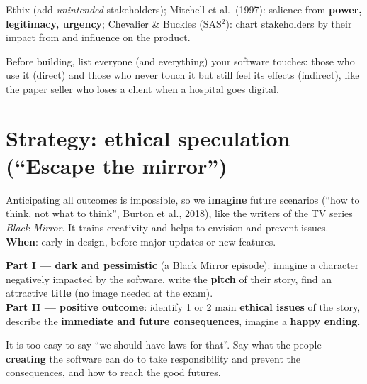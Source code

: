 \documentclass[11pt,a4paper,openany]{book}
\begin{document}
\begin{rembox}[title={Other approaches}]
Ethix (add \emph{unintended} stakeholders); Mitchell et al.\ (1997): salience from
\textbf{power, legitimacy, urgency}; Chevalier \& Buckles (SAS$^2$): chart stakeholders by their
impact from and influence on the product.
\end{rembox}

\begin{goatbox}
Before building, list everyone (and everything) your software touches: those who use it
(direct) and those who never touch it but still feel its effects (indirect), like the paper
seller who loses a client when a hospital goes digital.
\end{goatbox}


\section{Strategy: ethical speculation (``Escape the mirror'')}

\begin{defnbox}[title={Ethical speculation (Klassen \& Fiesler, 2022)}]
Anticipating all outcomes is impossible, so we \textbf{imagine} future scenarios
(``how to think, not what to think'', Burton et al., 2018), like the writers of the TV series
\emph{Black Mirror}. It trains creativity and helps to envision and prevent issues.
\textbf{When}: early in design, before major updates or new features.
\end{defnbox}

\begin{algbox}[title={Applying the strategy (cheat sheet 0.5)}]
\textbf{Part I --- dark and pessimistic} (a Black Mirror episode):
imagine a character negatively impacted by the software, write the \textbf{pitch} of their
story, find an attractive \textbf{title} (no image needed at the exam). \\
\textbf{Part II --- positive outcome}: identify 1 or 2 main \textbf{ethical issues} of the story,
describe the \textbf{immediate and future consequences}, imagine a \textbf{happy ending}.
\end{algbox}

\begin{warnbox}[title={Happy ending: not ``there should be a law''}]
It is too easy to say ``we should have laws for that''. Say what the people \textbf{creating}
the software can do to take responsibility and prevent the consequences, and how to reach the
good futures.
\end{warnbox}
\end{document}
